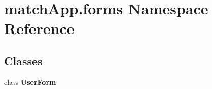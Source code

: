 \section{match\+App.\+forms Namespace Reference}
\label{namespacematch_app_1_1forms}
\subsection*{Classes}
\begin{DoxyCompactItemize}
\item 
class {\bf User\+Form}
\end{DoxyCompactItemize}
